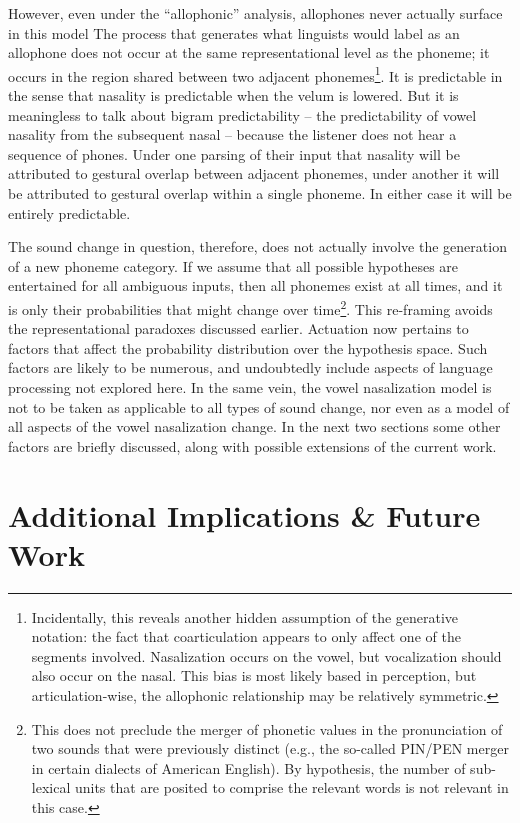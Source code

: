 However, even under the “allophonic” analysis, allophones never
actually surface in this model The process that generates what linguists
would label as an allophone does not occur at the same representational
level as the phoneme; it occurs in the region shared between two adjacent
phonemes\footnote{Incidentally, this reveals another hidden assumption of the generative
notation: the fact that coarticulation appears to only affect one
of the segments involved. Nasalization occurs on the vowel, but vocalization
should also occur on the nasal. This bias is most likely based in
perception, but articulation-wise, the allophonic relationship may
be relatively symmetric.}. It is predictable in the sense that nasality is predictable when
the velum is lowered. But it is meaningless to talk about bigram predictability
– the predictability of vowel nasality from the subsequent nasal –
because the listener does not hear a sequence of phones. Under one
parsing of their input that nasality will be attributed to gestural
overlap between adjacent phonemes, under another it will be attributed
to gestural overlap within a single phoneme. In either case it will
be entirely predictable. 

The sound change in question, therefore, does not actually involve
the generation of a new phoneme category. If we assume that all possible
hypotheses are entertained for all ambiguous inputs, then all phonemes
exist at all times, and it is only their probabilities that might
change over time\footnote{This does not preclude the merger of phonetic values in the pronunciation
of two sounds that were previously distinct (e.g., the so-called PIN/PEN
merger in certain dialects of American English). By hypothesis, the
number of sub-lexical units that are posited to comprise the relevant
words is not relevant in this case.}. This re-framing avoids the representational paradoxes discussed
earlier. Actuation now pertains to factors that affect the probability
distribution over the hypothesis space. Such factors are likely to
be numerous, and undoubtedly include aspects of language processing
not explored here. In the same vein, the vowel nasalization model
is not to be taken as applicable to all types of sound change, nor
even as a model of all aspects of the vowel nasalization change. In
the next two sections some other factors are briefly discussed, along
with possible extensions of the current work.

\section{Additional Implications \& Future Work}

